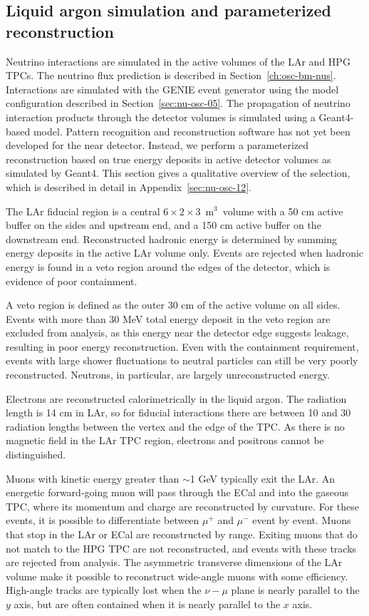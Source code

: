 \subsection{Liquid argon simulation and parameterized reconstruction}
\label{sec:larndsimreco}

Neutrino interactions are simulated in the active volumes of the LAr and HPG TPCs. The neutrino flux prediction is described in Section~\ref{ch:osc-bm-nus}. Interactions are simulated with the GENIE event generator using the model configuration described in Section~\ref{sec:nu-osc-05}. The propagation of neutrino interaction products through the detector volumes is simulated using a Geant4-based model. Pattern recognition and reconstruction software has not yet been developed for the near detector. Instead, we perform a parameterized reconstruction based on true energy deposits in active detector volumes as simulated by Geant4. This section gives a qualitative overview of the selection, which is described in detail in Appendix~\ref{sec:nu-osc-12}.

The LAr fiducial region is a central $6 \times 2 \times 3$~m$^{3}$~volume with a 50 cm active buffer on the sides and upstream end, and a 150 cm active buffer on the downstream end. Reconstructed hadronic energy is determined by summing energy deposits in the active LAr volume only. Events are rejected when hadronic energy is found in a veto region around the edges of the detector, which is evidence of poor containment. 

A veto region is defined as the outer 30 cm of the active volume on all sides. Events with more than 30 MeV total energy deposit in the veto region are excluded from analysis, as this energy near the detector edge suggests leakage, resulting in poor energy reconstruction. Even with the containment requirement, events with large shower fluctuations to neutral particles can still be very poorly reconstructed. Neutrons, in particular, are largely unreconstructed energy.

Electrons are reconstructed calorimetrically in the liquid argon. The radiation length is 14 cm in LAr, so for fiducial interactions there are between 10 and 30 radiation lengths between the vertex and the edge of the TPC. As there is no magnetic field in the LAr TPC region, electrons and positrons cannot be distinguished.

Muons with kinetic energy greater than $\sim$1 GeV typically exit the LAr. An energetic forward-going muon will pass through the ECal and into the gaseous TPC, where its momentum and charge are reconstructed by curvature. For these events, it is possible to differentiate between $\mu^{+}$ and $\mu^{-}$ event by event. Muons that stop in the LAr or ECal are reconstructed by range. Exiting muons that do not match to the HPG TPC are not reconstructed, and events with these tracks are rejected from analysis. The asymmetric transverse dimensions of the LAr volume make it possible to reconstruct wide-angle muons with some efficiency. High-angle tracks are typically lost when the $\nu-\mu$ plane is nearly parallel to the $y$ axis, but are often contained when it is nearly parallel to the $x$ axis. 

